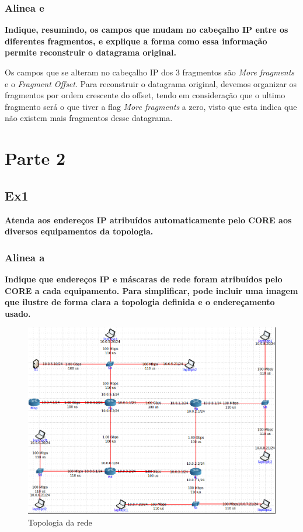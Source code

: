 \documentclass{article}
\begin{document}
\subsubsection{Alinea e}
\textbf{Indique, resumindo, os campos que mudam no cabeçalho IP entre os diferentes fragmentos, e explique a forma como essa informação permite reconstruir o datagrama original.} \\\par
Os campos que se alteram no cabeçalho IP dos 3 fragmentos são \textit{More fragments} e o \textit{Fragment Offset}. Para reconstruir o datagrama original, devemos organizar os fragmentos por ordem crescente do offset, tendo em consideração que o ultimo fragmento será o que tiver a flag \textit{More fragments} a zero, visto que esta indica que não existem mais fragmentos desse datagrama.\\

\newpage

\section{Parte 2}

\subsection{Ex1}
\textbf{Atenda aos endereços IP atribuídos automaticamente pelo CORE aos diversos equipamentos da topologia.}
\subsubsection{Alinea a}
\textbf{Indique que endereços IP e máscaras de rede foram atribuídos pelo CORE a cada equipamento. Para simplificar, pode incluir uma imagem que ilustre de forma clara a topologia definida e o endereçamento usado.}\\\par

\begin{figure}[h]
	\centering
	\includegraphics[scale = 0.4]{rede-tp2-ex1.png}
	\caption{Topologia da rede}
\end{figure}
\end{document}

